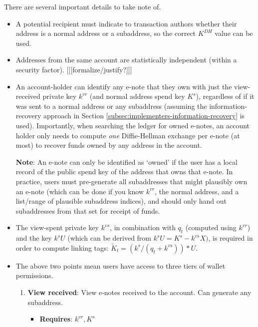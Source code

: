 There are several important details to take note of.

\begin{itemize}
    \item A potential recipient must indicate to transaction authors whether their address is a normal address or a subaddress, so the correct $K^{DH}$ value can be used.

    \item Addresses from the same account are statistically independent (within a security factor). [[[formalize/justify?]]]

    \item An account-holder can identify any e-note that they own with just the view-received private key $k^{vr}$ (and normal address spend key $K^s$), regardless of if it was sent to a normal address or any subaddress (assuming the information-recovery approach in Section \ref{subsec:implementers-information-recovery} is used). Importantly, when searching the ledger for owned e-notes, an account holder only needs to compute {\em one} Diffie-Hellman exchange per e-note (at most) to recover funds owned by any address in the account.

    \textbf{Note}: An e-note can only be identified as `owned' if the user has a local record of the public spend key of the address that owns that e-note. In practice, users must pre-generate all subaddresses that might plausibly own an e-note (which can be done if you know $k^{vr}$, the normal address, and a list/range of plausible subaddress indices), and should only hand out subaddresses from that set for receipt of funds.

    \item The view-spent private key $k^{vs}$, in combination with $q_t$ (computed using $k^{vr}$) and the key $k^s U$ (which can be derived from $k^s U = K^s - k^{vs} X)$, is required in order to compute linking tags: $\tilde{K}_t = (k^s/(q_t + k^{vs}))*U$.

    \item The above two points mean users have access to three tiers of wallet permissions.

    \begin{enumerate}
        \item \textbf{View received}: View e-notes received to the account. Can generate any subaddress.
        \begin{itemize}
            \item \textbf{Requires}: $k^{vr}, K^s$
        \end{itemize}


\end{enumerate}
\end{itemize}
